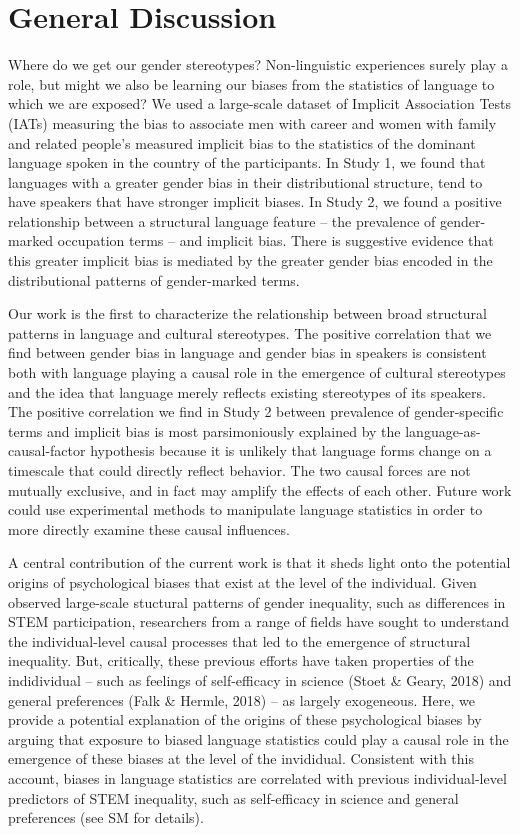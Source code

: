 \documentclass[man,floatsintext]{apa6}
\begin{document}
\hypertarget{general-discussion}{%
\section{General Discussion}\label{general-discussion}}

Where do we get our gender stereotypes? Non-linguistic experiences surely play a role, but might we also be learning our biases from the statistics of language to which we are exposed? We used a large-scale dataset of Implicit Association Tests (IATs) measuring the bias to associate men with career and women with family and related people's measured implicit bias to the statistics of the dominant language spoken in the country of the participants. In Study 1, we found that languages with a greater gender bias in their distributional structure, tend to have speakers that have stronger implicit biases. In Study 2, we found a positive relationship between a structural language feature -- the prevalence of gender-marked occupation terms -- and implicit bias. There is suggestive evidence that this greater implicit bias is mediated by the greater gender bias encoded in the distributional patterns of gender-marked terms.

Our work is the first to characterize the relationship between broad structural patterns in language and cultural stereotypes. The positive correlation that we find between gender bias in language and gender bias in speakers is consistent both with language playing a causal role in the emergence of cultural stereotypes and the idea that language merely reflects existing stereotypes of its speakers. The positive correlation we find in Study 2 between prevalence of gender-specific terms and implicit bias is most parsimoniously explained by the language-as-causal-factor hypothesis because it is unlikely that language forms change on a timescale that could directly reflect behavior. The two causal forces are not mutually exclusive, and in fact may amplify the effects of each other. Future work could use experimental methods to manipulate language statistics in order to more directly examine these causal influences.

A central contribution of the current work is that it sheds light onto the potential origins of psychological biases that exist at the level of the individual. Given observed large-scale stuctural patterns of gender inequality, such as differences in STEM participation, researchers from a range of fields have sought to understand the individual-level causal processes that led to the emergence of structural inequality. But, critically, these previous efforts have taken properties of the indidividual -- such as feelings of self-efficacy in science (Stoet \& Geary, 2018) and general preferences (Falk \& Hermle, 2018) -- as largely exogeneous. Here, we provide a potential explanation of the origins of these psychological biases by arguing that exposure to biased language statistics could play a causal role in the emergence of these biases at the level of the invididual. Consistent with this account, biases in language statistics are correlated with previous individual-level predictors of STEM inequality, such as self-efficacy in science and general preferences (see SM for details).
\end{document}
